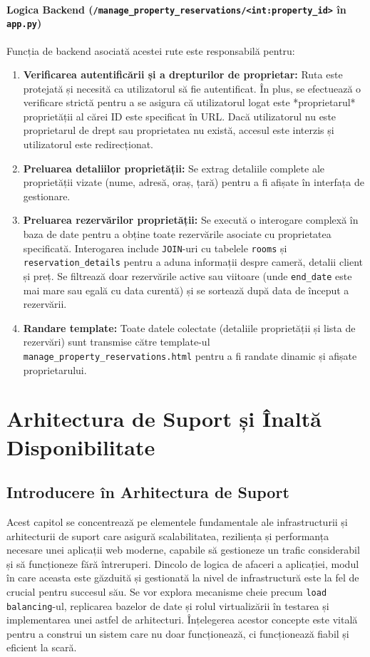 \documentclass[12pt, a4paper, oneside, romanian]{teza-upb}
\begin{document}
\subsubsection{Logica Backend (\texttt{/manage\_property\_reservations/<int:property\_id>} în \texttt{app.py})}
Funcția de backend asociată acestei rute este responsabilă pentru:
\begin{enumerate}
	\item \textbf{Verificarea autentificării și a drepturilor de proprietar:} Ruta este protejată și necesită ca utilizatorul să fie autentificat. În plus, se efectuează o verificare strictă pentru a se asigura că utilizatorul logat este *proprietarul* proprietății al cărei ID este specificat în URL. Dacă utilizatorul nu este proprietarul de drept sau proprietatea nu există, accesul este interzis și utilizatorul este redirecționat.
	\item \textbf{Preluarea detaliilor proprietății:} Se extrag detaliile complete ale proprietății vizate (nume, adresă, oraș, țară) pentru a fi afișate în interfața de gestionare.
	\item \textbf{Preluarea rezervărilor proprietății:} Se execută o interogare complexă în baza de date pentru a obține toate rezervările asociate cu proprietatea specificată. Interogarea include \texttt{JOIN}-uri cu tabelele \texttt{rooms} și \texttt{reservation\_details} pentru a aduna informații despre cameră, detalii client și preț. Se filtrează doar rezervările active sau viitoare (unde \texttt{end\_date} este mai mare sau egală cu data curentă) și se sortează după data de început a rezervării.
	\item \textbf{Randare template:} Toate datele colectate (detaliile proprietății și lista de rezervări) sunt transmise către template-ul \texttt{manage\_property\_reservations.html} pentru a fi randate dinamic și afișate proprietarului.
\end{enumerate}



\chapter{Arhitectura de Suport și Înaltă Disponibilitate}

\section{Introducere în Arhitectura de Suport}
Acest capitol se concentrează pe elementele fundamentale ale infrastructurii și arhitecturii de suport care asigură scalabilitatea, reziliența și performanța necesare unei aplicații web moderne, capabile să gestioneze un trafic considerabil și să funcționeze fără întreruperi. Dincolo de logica de afaceri a aplicației, modul în care aceasta este găzduită și gestionată la nivel de infrastructură este la fel de crucial pentru succesul său. Se vor explora mecanisme cheie precum \texttt{load balancing}-ul, replicarea bazelor de date și rolul virtualizării în testarea și implementarea unei astfel de arhitecturi. Înțelegerea acestor concepte este vitală pentru a construi un sistem care nu doar funcționează, ci funcționează fiabil și eficient la scară.
\end{document}
